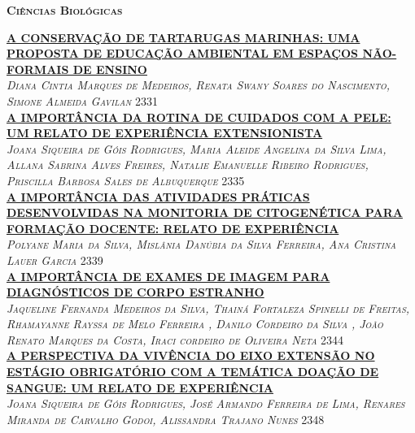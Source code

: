 \vspace*{2cm} 
\noindent \textsc{\textbf{\LARGE Ciências Biológicas}}\\ 
\vspace*{1cm} 

\noindent \textsc{\hyperlink{trabalhos/251713.pdf.1}{\textbf{A CONSERVAÇÃO DE TARTARUGAS MARINHAS: UMA PROPOSTA DE EDUCAÇÃO AMBIENTAL EM ESPAÇOS NÃO-FORMAIS DE ENSINO}}}\\ 
\noindent \textsc{\textit{Diana Cintia Marques de Medeiros, Renata Swany Soares do Nascimento, Simone Almeida Gavilan}} \hfill 2331\\ 

\noindent \textsc{\hyperlink{trabalhos/248043.pdf.1}{\textbf{A IMPORTÂNCIA DA ROTINA DE CUIDADOS COM A PELE: UM RELATO DE EXPERIÊNCIA  EXTENSIONISTA }}}\\ 
\noindent \textsc{\textit{Joana Siqueira de Góis Rodrigues, Maria Aleide Angelina da Silva Lima, Allana Sabrina Alves Freires, Natalie Emanuelle Ribeiro Rodrigues, Priscilla Barbosa Sales de Albuquerque}} \hfill 2335\\ 

\noindent \textsc{\hyperlink{trabalhos/250197.pdf.1}{\textbf{A IMPORTÂNCIA DAS ATIVIDADES PRÁTICAS DESENVOLVIDAS NA MONITORIA DE CITOGENÉTICA PARA FORMAÇÃO DOCENTE: RELATO DE EXPERIÊNCIA}}}\\ 
\noindent \textsc{\textit{Polyane Maria da Silva, Mislânia Danúbia da Silva Ferreira, Ana Cristina Lauer Garcia}} \hfill 2339\\ 

\noindent \textsc{\hyperlink{trabalhos/250031.pdf.1}{\textbf{A IMPORTÂNCIA DE EXAMES DE IMAGEM PARA DIAGNÓSTICOS DE CORPO ESTRANHO}}}\\ 
\noindent \textsc{\textit{Jaqueline Fernanda Medeiros da Silva, Thainá Fortaleza Spinelli de Freitas, Rhamayanne Rayssa de Melo Ferreira	, Danilo Cordeiro da Silva	, João Renato Marques da Costa, Iraci cordeiro de Oliveira Neta}} \hfill 2344\\ 

\noindent \textsc{\hyperlink{trabalhos/251323.pdf.1}{\textbf{A PERSPECTIVA DA VIVÊNCIA DO EIXO EXTENSÃO NO ESTÁGIO OBRIGATÓRIO COM A TEMÁTICA DOAÇÃO DE SANGUE: UM RELATO DE EXPERIÊNCIA }}}\\ 
\noindent \textsc{\textit{Joana Siqueira de Góis Rodrigues, José Armando Ferreira de Lima, Renares Miranda de Carvalho Godoi, Alissandra Trajano Nunes}} \hfill 2348\\ 


